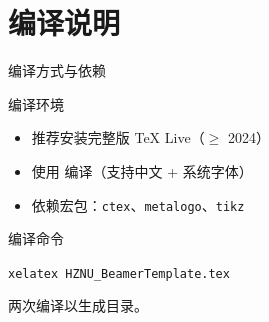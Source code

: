 \documentclass[10pt,aspectratio=169]{beamer}
\begin{document}
\section{编译说明}
\begin{frame}{编译方式与依赖}
  \begin{block}{编译环境}
    \begin{itemize}
      \item 推荐安装完整版 TeX Live（\(≥\) 2024）
      \item 使用 \alert{\XeLaTeX} 编译（支持中文 + 系统字体）
      \item 依赖宏包：\texttt{ctex}、\texttt{metalogo}、\texttt{tikz}
    \end{itemize}
  \end{block}

  \vspace{.25cm}
  \begin{exampleblock}{编译命令}
    \begin{center}
      \texttt{xelatex HZNU\_BeamerTemplate.tex}
    \end{center}
    两次编译以生成目录。
  \end{exampleblock}

\end{frame}

\end{document}
